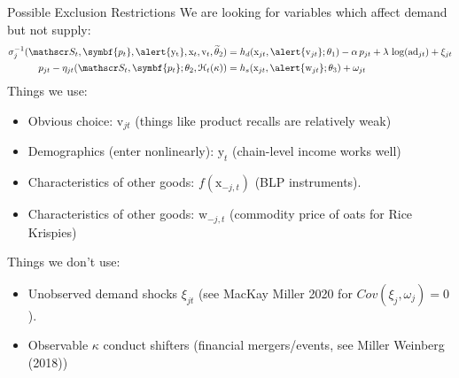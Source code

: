 \documentclass[aspectratio=169,10pt]{beamer}
\begin{document}
\begin{frame}{Possible Exclusion Restrictions}
We are looking for variables which affect \alert{demand but not supply}:
\begin{align*}
\sigma_{j}^{-1}(\calS_t, \symbf{p_t},\alert{\mathrm{y_t}}, \mathrm{x}_t,  \mathrm{v}_t, \widetilde{\theta}_2) 
&= h_d(\mathrm{x}_{jt},\alert{ \mathrm{v}_{jt}}; \theta_1) - \alpha\, p_{jt} + \lambda \, \log(\text{ad}_{jt})+ \xi_{jt} \\
p_{jt} - \eta_{jt}(\calS_t, \symbf{p_t}; \theta_2, \mathcal{H}_t(\kappa))
&= h_s(\textrm{x}_{jt}, \alert{\mathrm{w}_{jt}}; \theta_3) + \omega_{jt} 
\end{align*}
Things we use:
\begin{itemize}
    \item Obvious choice: $\mathrm{v}_{jt}$ (things like product recalls are relatively weak)
    \item Demographics (enter nonlinearly): $\mathrm{y}_t$ (chain-level income works well)
    \item Characteristics of other goods: $f(\mathrm{x}_{-j,t})$ (BLP instruments).
    \item Characteristics of other goods: $\mathrm{w}_{-j,t}$ (commodity price of oats for Rice Krispies)
\end{itemize}

Things we don't use:
\begin{itemize}
    \item Unobserved demand shocks $\xi_{jt}$ (see MacKay Miller 2020 for $Cov(\xi_j,\omega_j)=0$).
    \item Observable $\kappa$ conduct shifters (financial mergers/events, see Miller Weinberg (2018))
\end{itemize}
\end{frame}
\end{document}
